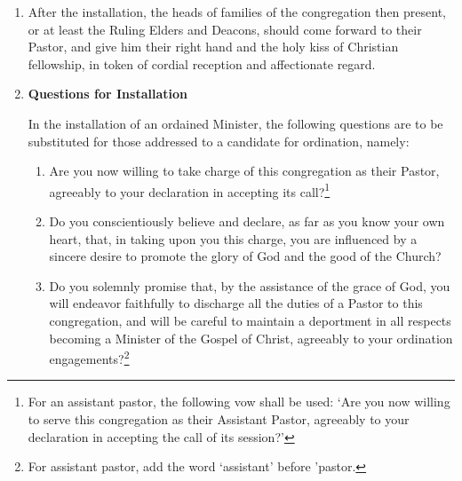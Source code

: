 \documentclass[
]{book}
\providecommand{\tightlist}{%
  \setlength{\itemsep}{0pt}\setlength{\parskip}{0pt}}
\begin{document}
\begin{enumerate}
\def\labelenumi{\arabic{enumi}.}
\setcounter{enumi}{8}
\item
  After the installation, the heads of families of the congregation then present, or at least the Ruling Elders and Deacons, should come forward to their Pastor, and give him their right hand and the holy kiss of Christian fellowship, in token of cordial reception and affectionate regard.
\item
  \protect\hypertarget{23.10}{\href{}{}}\textbf{Questions for Installation}

  In the installation of an ordained Minister, the following questions are to be substituted for those addressed to a candidate for ordination, namely:

  \begin{enumerate}
  \def\labelenumii{\alph{enumii}.}
  \tightlist
  \item
    Are you now willing to take charge of this congregation as their Pastor, agreeably to your declaration in accepting its call?\footnote{For an assistant pastor, the following vow shall be used: `Are you now willing to serve this congregation as their Assistant Pastor, agreeably to your declaration in accepting the call of its session?'}
  \item
    Do you conscientiously believe and declare, as far as you know your own heart, that, in taking upon you this charge, you are influenced by a sincere desire to promote the glory of God and the good of the Church?
  \item
    Do you solemnly promise that, by the assistance of the grace of God, you will endeavor faithfully to discharge all the duties of a Pastor to this congregation, and will be careful to maintain a deportment in all respects becoming a Minister of the Gospel of Christ, agreeably to your ordination engagements?\footnote{For assistant pastor, add the word `assistant' before 'pastor.}
  \end{enumerate}
\end{enumerate}
\end{document}
